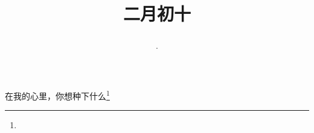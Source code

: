 \title{\date[d=19,m=3,y=2024][year:cn-y,年,month:cn,day:cn,日,·,weekday]·二月初十 }
在我的心里，你想种下什么\footnote{ }

